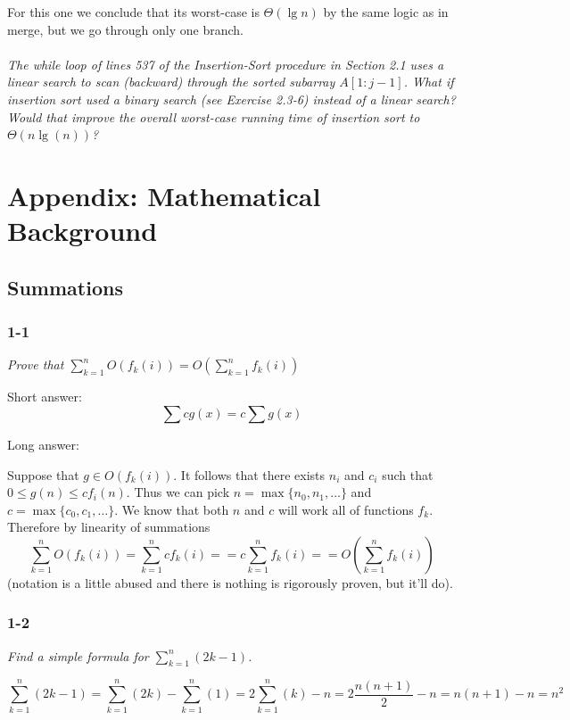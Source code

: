 \documentclass[11pt,oneside,titlepage]{book}
\begin{document}
For this one we conclude that its worst-case is $\Theta(\lg n)$ by the same logic as in merge,
but we go through only one branch.

\subsection{}

\textit{The while loop of lines 537 of the Insertion-Sort procedure in Section 2.1
  uses a linear search to scan (backward) through the sorted subarray $A[1:j - 1]$.
  What if insertion sort used a binary search (see Exercise 2.3-6) instead of a linear
  search? Would that improve the overall worst-case running time of insertion sort
  to $\Theta(n \lg(n))$?}





\part{Appendix: Mathematical Background}
\chapter{Summations}

\section*{1-1}
\textit{Prove that $\sum_{k  = 1}^n{O(f_k(i))} = O(\sum_{k  = 1}^n{f_k(i)})$}

Short answer:
$$\sum cg(x) = c\sum{g(x)}$$

Long answer:

Suppose that $g \in O(f_k(i))$. It follows that there exists $n_i$ and $c_i$
such that $0 \leq g(n) \leq cf_i(n)$. Thus we can pick
$n = \max\{n_0, n_1, ...\}$ and $c = \max\{c_0, c_1, ... \}$. We know that
both $n$ and $c$ will work all of functions $f_k$. Therefore by
linearity of summations
$$\sum_{k  = 1}^n{O(f_k(i))}
= \sum_{k  = 1}^n{cf_k(i)} =
= c\sum_{k  = 1}^n{f_k(i)} = 
= O(\sum_{k  = 1}^n{f_k(i)})$$
(notation is a little abused and there is nothing is rigorously
proven, but it'll do).

\section*{1-2}
\textit{Find a simple formula for $\sum_{k = 1}^n{(2k - 1)}$.}

$$\sum_{k = 1}^n{(2k - 1)} =
\sum_{k = 1}^n{(2k)} - \sum_{k = 1}^n{(1)} =
2\sum_{k = 1}^n{(k)} - n =
2\frac{n(n + 1)}{2} - n =
n(n + 1) - n =
n^2
$$
\end{document}
